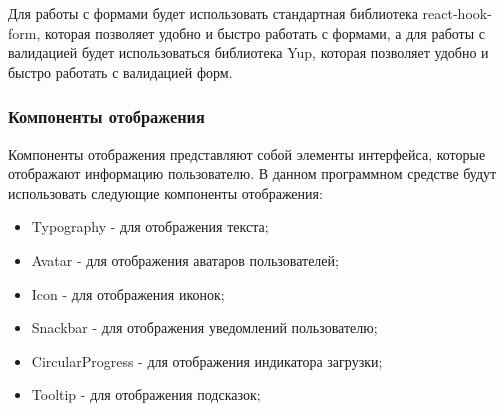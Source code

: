 Для работы с формами будет использовать стандартная библиотека react-hook-form, которая позволяет удобно и быстро работать с формами,
а для работы с валидацией будет использоваться библиотека Yup, которая позволяет удобно и быстро работать с валидацией форм.

\subsubsection{Компоненты отображения}

Компоненты отображения представляют собой элементы интерфейса, которые отображают информацию пользователю.
В данном программном средстве будут использовать следующие компоненты отображения:
\begin{itemize}
    \item Typography - для отображения текста;
    \item Avatar - для отображения аватаров пользователей;
    \item Icon - для отображения иконок;
    \item Snackbar - для отображения уведомлений пользователю;
    \item CircularProgress - для отображения индикатора загрузки;
    \item Tooltip - для отображения подсказок;
\end{itemize}